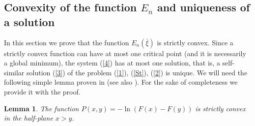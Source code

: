 \documentclass[12pt]{article}
\theoremstyle{plain}
\newtheorem{lemma}{Lemma}[section]
\theoremstyle{definition}
\numberwithin{equation}{section}
\begin{document}
\subsection{Convexity of the function $E_n$ and uniqueness of a solution}

In this section we prove that the function $E_n(\bar\xi)$ is strictly convex. Since a strictly convex function can have at most one critical point (and it is necessarily a global minimum), the system (\ref{4}) has at most one solution, that is, a self-similar solution (\ref{3}) of the problem (\ref{1}), (\ref{St}), (\ref{2}) is unique. We will need the following simple lemma proven in \cite{Pan1} (see also \cite{Pan2}). For the sake of completeness we provide it with the proof.

\begin{lemma}\label{lem1}
The function $P(x,y)=-\ln (F(x)-F(y))$ is strictly convex in the half-plane $x>y$.
\end{lemma}
\end{document}
